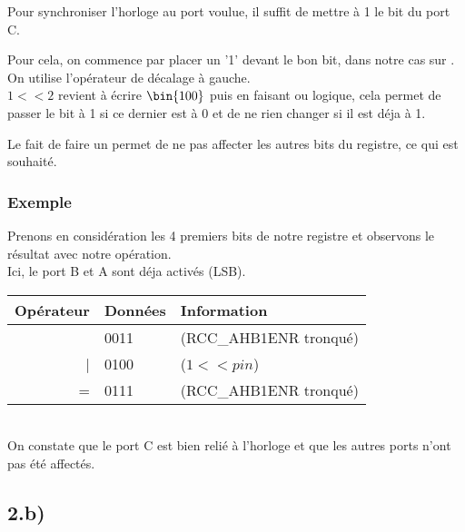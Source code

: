 Pour synchroniser l'horloge au port voulue, il suffit de mettre à 1 le bit du port C.

Pour cela, on commence par placer un '1' devant le bon bit, dans notre cas sur . On utilise l'opérateur de décalage à gauche.\\



$1 << 2$ revient à écrire $\bin{100}$ puis en faisant ou  logique, cela permet de passer le bit à 1 si ce dernier est à 0 et de ne rien changer si il est déja à 1.


Le fait de faire un  permet de ne pas affecter les autres bits du registre, ce qui est souhaité. 

\subsubsection{Exemple}
Prenons en considération les 4 premiers bits de notre registre  et observons le résultat avec notre opération.\\
Ici, le port B et A sont déja activés (LSB).\\

\begin{tabular}{rl|l}
  Opérateur & Données & Information \\
\hline
    & 0011 & (RCC\_AHB1ENR tronqué)\\
   | & 0100 & ($1 << pin$)\\
   \hline
   = & 0111 & (RCC\_AHB1ENR tronqué)\\
  
\end{tabular} \\

On constate que le port C est bien relié à l'horloge et que les autres ports n'ont pas été affectés.

\subsection{2.b)}

